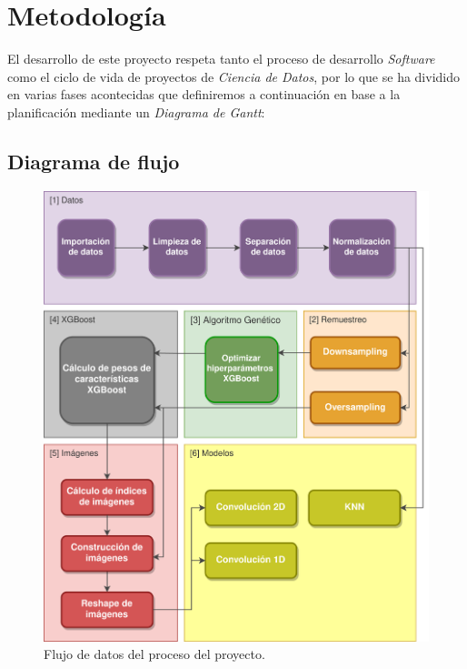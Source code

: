 
\chapter{Metodología}
\label{metodologia}

El desarrollo de este proyecto respeta tanto el proceso de desarrollo \textit{Software} como el ciclo de vida de proyectos de \textit{Ciencia de Datos}, por lo que se ha dividido en varias fases acontecidas que definiremos a continuación en base a la planificación mediante un \textit{Diagrama de Gantt}:


\section{Diagrama de flujo}

    \begin{figure}[H]
        \centering
        \includegraphics[width=15cm]{archivos/DataflowImageESP}
        \caption{Flujo de datos del proceso del proyecto.}
        \label{DataflowImage}
    \end{figure}

